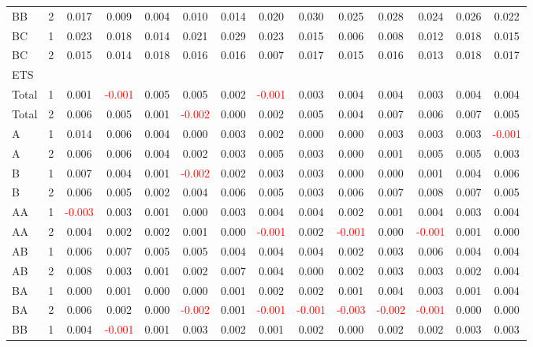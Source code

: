 \begin{table}[H]
{\begin{tabular}{llcccccccccccc}
BB & 2 & 0.017 & 0.009 & 0.004 & 0.010 & 0.014 & 0.020 & 0.030 & 0.025 & 0.028 & 0.024 & 0.026 & 0.022\\
BC & 1 & 0.023 & 0.018 & 0.014 & 0.021 & 0.029 & 0.023 & 0.015 & 0.006 & 0.008 & 0.012 & 0.018 & 0.015\\
BC & 2 & 0.015 & 0.014 & 0.018 & 0.016 & 0.016 & 0.007 & 0.017 & 0.015 & 0.016 & 0.013 & 0.018 & 0.017\\
\hline
ETS &  &  &  &  &  &  &  &  &  &  &  &  & \\
\hline
Total & 1 & 0.001 & \textcolor{red}{-0.001} & 0.005 & 0.005 & 0.002 & \textcolor{red}{-0.001} & 0.003 & 0.004 & 0.004 & 0.003 & 0.004 & 0.004\\
Total & 2 & 0.006 & 0.005 & 0.001 & \textcolor{red}{-0.002} & 0.000 & 0.002 & 0.005 & 0.004 & 0.007 & 0.006 & 0.007 & 0.005\\
A & 1 & 0.014 & 0.006 & 0.004 & 0.000 & 0.003 & 0.002 & 0.000 & 0.000 & 0.003 & 0.003 & 0.003 & \textcolor{red}{-0.001}\\
A & 2 & 0.006 & 0.006 & 0.004 & 0.002 & 0.003 & 0.005 & 0.003 & 0.000 & 0.001 & 0.005 & 0.005 & 0.003\\
B & 1 & 0.007 & 0.004 & 0.001 & \textcolor{red}{-0.002} & 0.002 & 0.003 & 0.003 & 0.000 & 0.000 & 0.001 & 0.004 & 0.006\\
B & 2 & 0.006 & 0.005 & 0.002 & 0.004 & 0.006 & 0.005 & 0.003 & 0.006 & 0.007 & 0.008 & 0.007 & 0.005\\
AA & 1 & \textcolor{red}{-0.003} & 0.003 & 0.001 & 0.000 & 0.003 & 0.004 & 0.004 & 0.002 & 0.001 & 0.004 & 0.003 & 0.004\\
AA & 2 & 0.004 & 0.002 & 0.002 & 0.001 & 0.000 & \textcolor{red}{-0.001} & 0.002 & \textcolor{red}{-0.001} & 0.000 & \textcolor{red}{-0.001} & 0.001 & 0.000\\
AB & 1 & 0.006 & 0.007 & 0.005 & 0.005 & 0.004 & 0.004 & 0.004 & 0.002 & 0.003 & 0.006 & 0.004 & 0.004\\
AB & 2 & 0.008 & 0.003 & 0.001 & 0.002 & 0.007 & 0.004 & 0.000 & 0.002 & 0.003 & 0.003 & 0.002 & 0.004\\
BA & 1 & 0.000 & 0.001 & 0.000 & 0.000 & 0.001 & 0.002 & 0.002 & 0.001 & 0.004 & 0.003 & 0.001 & 0.004\\
BA & 2 & 0.006 & 0.002 & 0.000 & \textcolor{red}{-0.002} & 0.001 & \textcolor{red}{-0.001} & \textcolor{red}{-0.001} & \textcolor{red}{-0.003} & \textcolor{red}{-0.002} & \textcolor{red}{-0.001} & 0.000 & 0.000\\
BB & 1 & 0.004 & \textcolor{red}{-0.001} & 0.001 & 0.003 & 0.002 & 0.001 & 0.002 & 0.000 & 0.002 & 0.002 & 0.003 & 0.003\\

\end{tabular}}
\end{table}
